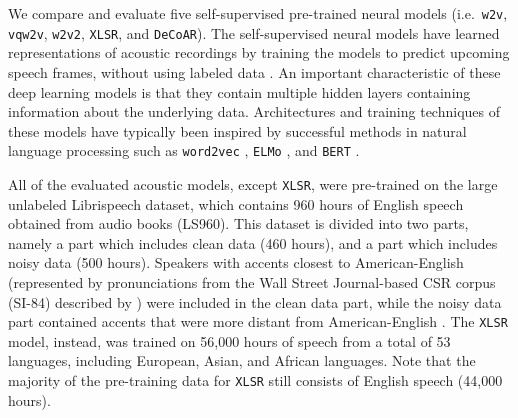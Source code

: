 \documentclass[11pt,a4paper]{article}
\begin{document}
We compare and evaluate five self-supervised pre-trained neural models (i.e.~\texttt{w2v}, \texttt{vqw2v}, \texttt{w2v2}, \texttt{XLSR}, and \texttt{DeCoAR}).
The self-supervised neural models have learned representations of acoustic recordings by training the models to predict upcoming speech frames, without using labeled data \citep{schneider2019wav2vec, ling2020deep, baevski2019vq, baevski2020wav2vec}. An important characteristic of these deep learning models is that they contain multiple hidden layers containing information about the underlying data.  
Architectures and training techniques of these models have typically been inspired by successful methods in natural language processing such as \texttt{word2vec} \citep{mikolov_distributed_2013}, \texttt{ELMo} \citep{petersDeepContextualizedWord2018}, and \texttt{BERT} \citep{devlin_bert_2019}.


All of the evaluated acoustic models, except \texttt{XLSR}, were pre-trained on the large unlabeled Librispeech dataset, which contains 960 hours of English speech obtained from audio books (LS960). This dataset is divided into two parts, namely a part which includes clean data (460 hours), and a part which includes noisy data (500 hours).
Speakers with accents closest to American-English (represented by pronunciations from the Wall Street Journal-based CSR corpus (SI-84) described by \citealt{paul-baker-1992-design}) were included in the clean data part, while the noisy data part contained accents that were more distant from American-English \citep{panayotov_librispeech_2015}.
The \texttt{XLSR} model, instead, was trained on 56,000 hours of speech from a total of 53 languages, including European, Asian, and African languages.
Note that the majority of the pre-training data for \texttt{XLSR} still consists of English speech (44,000 hours).
\end{document}
